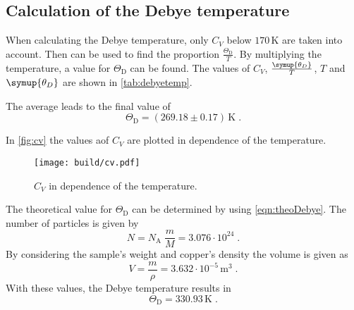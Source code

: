 \subsection{Calculation of the Debye temperature}%

When calculating the Debye temperature, only $C_{{V}}$ below $170\, \unit{\kelvin}$ are taken into account.
Then \cite{ap47} can be used to find the proportion $\frac{\Theta_{\text{D}}}{T}$.
By multiplying the temperature, a value for $\Theta _{\text{D}}$ can be found. The values of $C_V$, $\frac{\symup{\theta_D}}{T}$, $T$ and 
$\symup{\theta_D}$ are shown in \autoref{tab:debyetemp}.



The average leads to the final value of
\begin{equation*}
    \Theta _{\text{D}}= (269.18 \pm  0.17)\,\unit{\kelvin} \; .
\end{equation*}

In \autoref{fig:cv} the values aof $C_V$ are plotted in dependence of the temperature.
\begin{figure}
    \centering
        \texttt{[image: build/cv.pdf]}
        \caption{$C_V$ in dependence of the temperature.}
        \label{fig:cv}
\end{figure}



The theoretical value for $\Theta _{\text{D}}$ can be determined by using \autoref{eqn:theoDebye}.
The number of particles is given by 
\begin{equation*}
    N=N_{\text{A}}\; \frac{m}{M}=3.076 \cdot 10^{24}\; .
\end{equation*}
By considering the sample's weight and copper's density the volume is given as 
\begin{equation*}
    V=\frac{m}{\rho}=3.632 \cdot 10^{-5} \, \unit{\meter}^3\; .
\end{equation*}
With these values, the Debye temperature results in
\begin{equation*}
    \Theta_{\text{D}}=330.93\, \unit{\kelvin}\; .
\end{equation*}